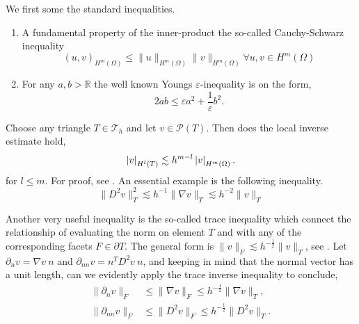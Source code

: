 We first some the standard inequalities.
\begin{enumerate}[label=(\roman*)]
    \item A fundamental property of the inner-product the so-called Cauchy-Schwarz inequality
    \[
     ( u,v)_{H^{m}( \Omega )  }   \le \| u \|_{H^{m}( \Omega )   }^{  } \| v \|_{H^{m}( \Omega )    }^{  } \forall u,v \in H^{m}( \Omega )
    \]

    \item For any $a,b >\mathbb{R} $ the well known Youngs $\varepsilon $-inequality is on the form,
        \[
            2ab \le \varepsilon a^2+ \frac{1}{\varepsilon } b^2.
        \]
\end{enumerate}

Choose any triangle $T \in \mathcal{T}_{h} $ and let $v \in \mathcal{P}( T)  $. Then does the local inverse estimate hold,
$$
\left\lvert  v  \right\rvert_{H^{l}( T) } \lesssim h^{m-l} \left\lvert  v  \right\rvert_{H^{m}( \Omega ) }.
$$
for $l \le m$. For proof, see \cite[Lemma 12.1]{ErnGuermond2021}. An essential example is the following inequality.
$$\| D^2v \|_{T  }^{ 2 } \lesssim h^{-1} \| \nabla v  \|_{ T  }^{  } \lesssim h^{-2} \| v \|_{T  }^{  }   $$

Another very useful inequality is the so-called trace inequality which connect the relationship of evaluating the norm on element $ T $ and with any of the corresponding facets $F \in \partial T$. The general form is $\| v \|_{F   }^{  }  \lesssim
h^{-\frac{1}{2}} \| v \|_{ T  }^{  } $, see \cite[Lemma 12.8]{ErnGuermond2021}.
Let $\partial _{n} v = \nabla v \ n$ and $\partial_{nn} v = n^{T} D^2 v \ n $, and keeping in mind that the normal vector has a unit length, can we evidently apply the trace inverse inequality to conclude, \[
\begin{split}
    \| \partial _{n} v \|_{F  }^{  }  & \le \| \nabla v \|_{F  }^{  }  \le h^{-\frac{1}{2}} \| \nabla  v \|_{T  }^{  },  \\
    \| \partial _{nn} v \|_{ F }^{  } & \le  \| D^2 v \|_{ F }^{  }   \le  h^{-\frac{1}{2}} \| D^2 v \|_{ T }^{  }.
\end{split}
\]





